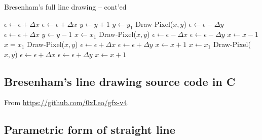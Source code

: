 \documentclass[a4paper]{article}
\begin{document}
\begin{algorithm}[H]
\caption{Bresenham's full line drawing -- cont'ed}
\label{alg:bres_pt2}
\begin{algorithmic}[1]
	\Indent
	\State $\epsilon \leftarrow \epsilon + \Delta x$
		\State $\epsilon \leftarrow \epsilon + \Delta x$
		\State $y \leftarrow y + 1$
	  
		\State $y\leftarrow y_1$
			\State Draw-Pixel($x,y$)
			\State $\epsilon \leftarrow \epsilon - \Delta y$
				\State $\epsilon \leftarrow \epsilon + \Delta x$
				\State $y \leftarrow y - 1$
			\EndIf
		\EndFor
	 
		\State $x\leftarrow x_1$
			\State Draw-Pixel($x,y$)
			\State $\epsilon \leftarrow \epsilon - \Delta x$
				\State $\epsilon \leftarrow \epsilon - \Delta y$
				\State $x \leftarrow x - 1$
			\EndIf
		\EndFor
	 
		\State $x = x_1$
			\State Draw-Pixel($x,y$)
			\State $\epsilon \leftarrow \epsilon + \Delta x$
				\State $\epsilon \leftarrow \epsilon + \Delta y$
				\State $x\leftarrow x+1$
			\EndIf
		\EndFor
	 
		\State $x\leftarrow x_1$
			\State Draw-Pixel($x,y$)
			\State $\epsilon \leftarrow \epsilon + \Delta x$
				\State $\epsilon \leftarrow \epsilon + \Delta y$
				\State $x\leftarrow x+ 1$
			\EndIf
		\EndFor
	 
	\State {}
	\EndIf
	\EndIndent
\end{algorithmic}
\end{algorithm}


\newpage
\subsection{Bresenham's line drawing source code in C}
\label{app:bresenham_full_src}

From \url{https://github.com/0xLeo/gfx-v4}.



\newpage
\subsection{Parametric form of straight line}
\label{app:param_straight_line}
\end{document}
